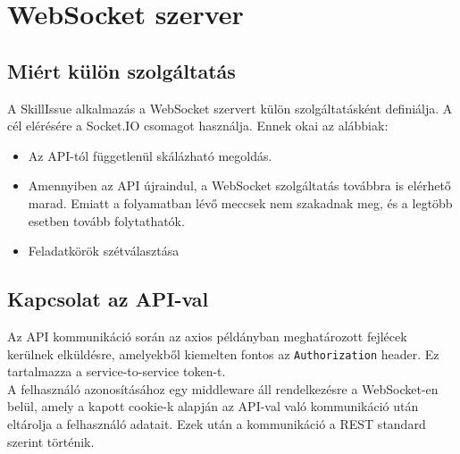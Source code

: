 \chapter{WebSocket szerver}

\section{Miért külön szolgáltatás}
A SkillIssue alkalmazás a WebSocket szervert külön szolgáltatásként definiálja. A cél elérésére a Socket.IO csomagot használja. Ennek okai az alábbiak:
\begin{itemize}
    \item Az API-tól függetlenül skálázható megoldás.
    \item Amennyiben az API újraindul, a WebSocket szolgáltatás továbbra is elérhető marad. Emiatt a folyamatban lévő meccsek nem szakadnak meg, és a legtöbb esetben tovább folytathatók.
    \item Feladatkörök szétválasztása
\end{itemize}

\section{Kapcsolat az API-val}
Az API kommunikáció során az axios példányban meghatározott fejlécek kerülnek elküldésre, amelyekből kiemelten fontos az \texttt{Authorization} header. Ez tartalmazza a service-to-service token-t.
\\
A felhasználó azonosításához egy middleware áll rendelkezésre a WebSocket-en belül, amely a kapott cookie-k alapján az API-val való kommunikáció után eltárolja a felhasználó adatait.
Ezek után a kommunikáció a REST standard szerint történik.

